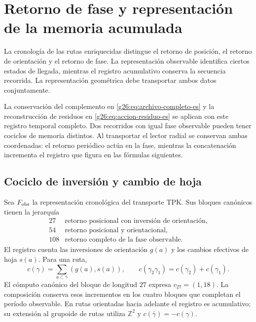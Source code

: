 
\section{Retorno de fase y representación de la memoria acumulada}
\label{vii:sec:retorno-memoria-gravedad}

La cronología de las rutas enriquecidas distingue el retorno de posición,
el retorno de orientación y el retorno de fase. La representación observable
identifica ciertos estados de llegada, mientras el registro acumulativo
conserva la secuencia recorrida. La representación geométrica debe
transportar ambos datos conjuntamente.

La conservación del complemento en
\eqref{g26:eq:archivo-completo-es} y la reconstrucción de residuos en
\eqref{g26:eq:accion-residuo-es} se aplican con este registro temporal
completo. Dos recorridos con igual fase observable pueden tener cociclos
de memoria distintos. Al transportar el lector radial se conservan
ambas coordenadas: el retorno periódico actúa en la fase, mientras la
concatenación incrementa el registro que figura en las fórmulas siguientes.

\subsection{Cociclo de inversión y cambio de hoja}
\label{vii:subsec:cociclo-memoria}

Sea \(F_{\rm obs}\) la representación cronológica del transporte TPK.
Sus bloques canónicos tienen la jerarquía
\[
\begin{array}{c|l}
27&\text{retorno posicional con inversión de orientación},\\
54&\text{retorno posicional y orientacional},\\
108&\text{retorno completo de la fase observable}.
\end{array}
\]
El registro cuenta las inversiones de orientación \(g(a)\) y los
cambios efectivos de hoja \(s(a)\). Para una ruta,
\begin{equation}
 c(\gamma)=\sum_{a\subset\gamma}(g(a),s(a)),\qquad
 c(\gamma_2\gamma_1)=c(\gamma_2)+c(\gamma_1).
 \label{vii:eq:cociclo-ruta}
\end{equation}
El cómputo canónico del bloque de longitud \(27\) expresa
\(c_{27}=(1,18)\). La composición conserva esos incrementos en
los cuatro bloques que completan el período observable.
En rutas orientadas hacia adelante el registro es acumulativo;
su extensión al grupoide de rutas utiliza \(\mathbb Z^2\) y
\(c(\bar\gamma)=-c(\gamma)\).

